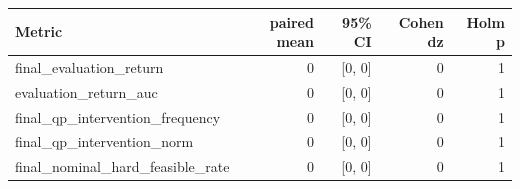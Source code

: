 \begin{tabular}{lrrrr}
\toprule
Metric & paired mean & 95\% CI & Cohen dz & Holm p \\
\midrule
final\_evaluation\_return & 0 & [0, 0] & 0 & 1 \\
evaluation\_return\_auc & 0 & [0, 0] & 0 & 1 \\
final\_qp\_intervention\_frequency & 0 & [0, 0] & 0 & 1 \\
final\_qp\_intervention\_norm & 0 & [0, 0] & 0 & 1 \\
final\_nominal\_hard\_feasible\_rate & 0 & [0, 0] & 0 & 1 \\
\bottomrule
\end{tabular}
